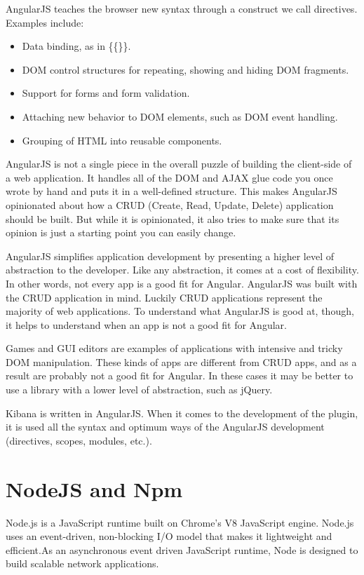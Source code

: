 \documentclass[a4paper, 12pt]{book}
\begin{document}
AngularJS teaches the browser new syntax through a construct we call directives. Examples include:

\begin{itemize}
\item Data binding, as in \{\{\}\}.
\item DOM control structures for repeating, showing and hiding DOM fragments.
\item Support for forms and form validation.
\item Attaching new behavior to DOM elements, such as DOM event handling.
\item Grouping of HTML into reusable components.
\end{itemize}

AngularJS is not a single piece in the overall puzzle of building the client-side of a web application. It handles all of the DOM and AJAX glue code you once wrote by hand and puts it in a well-defined structure. This makes AngularJS opinionated about how a CRUD (Create, Read, Update, Delete) application should be built. But while it is opinionated, it also tries to make sure that its opinion is just a starting point you can easily change.

AngularJS simplifies application development by presenting a higher level of abstraction to the developer. Like any abstraction, it comes at a cost of flexibility. In other words, not every app is a good fit for Angular. AngularJS was built with the CRUD application in mind. Luckily CRUD applications represent the majority of web applications. To understand what AngularJS is good at, though, it helps to understand when an app is not a good fit for Angular.

Games and GUI editors are examples of applications with intensive and tricky DOM manipulation. These kinds of apps are different from CRUD apps, and as a result are probably not a good fit for Angular. In these cases it may be better to use a library with a lower level of abstraction, such as jQuery.

Kibana is written in AngularJS. When it comes to the development of the plugin, it is used all the syntax and optimum ways of the AngularJS development (directives, scopes, modules, etc.).

\section{NodeJS and Npm}
\label{sec:nodejsnpm}
Node.js is a JavaScript runtime built on Chrome's V8 JavaScript engine. Node.js uses an event-driven, non-blocking I/O model that makes it lightweight and efficient.As an asynchronous event driven JavaScript runtime, Node is designed to build scalable network applications.
\end{document}
